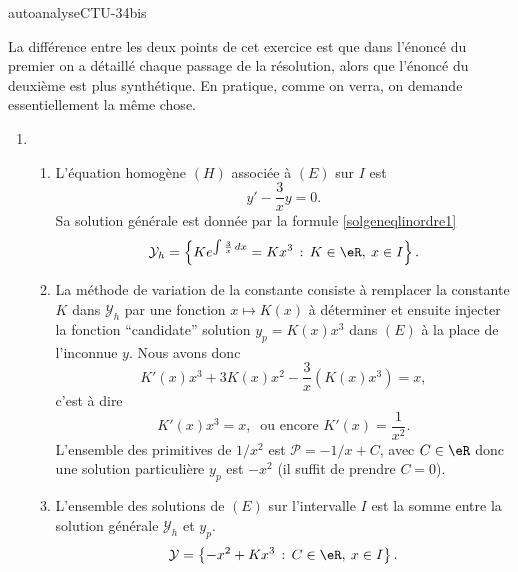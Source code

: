 
\begin{corrige}{autoanalyseCTU-34bis}

La différence entre les deux points de cet exercice est que dans l'énoncé du  premier on a détaillé chaque passage de la résolution, alors que l'énoncé du deuxième est plus synthétique. En pratique, comme on verra, on demande essentiellement la m\^eme chose.  

\begin{enumerate}
\item 
    \begin{enumerate}
    \item L'équation homogène $(H)$ associée à $(E)$ sur $I$ est 
      \begin{equation*}
        y'-\dfrac{3}{x}y=0. 
      \end{equation*}
      Sa solution générale est donnée par la formule \eqref{solgeneqlinordre1}
      \begin{equation*}
        \mathcal{Y}_h=\left\{Ke^{\int\frac{3}{x}\, dx} = Kx^3\,:\, K\in\eR, \: x\in I \right\}.
      \end{equation*}
    \item La méthode de variation de la constante consiste à remplacer la constante $K$ dans $\mathcal{Y}_h$ par une fonction $x\mapsto K(x)$ à déterminer et ensuite injecter la fonction ``candidate'' solution $y_p = K(x)x^3$ dans $(E)$ à la place de l'inconnue $y$. Nous avons donc 
      \begin{equation*}
        K'(x)x^3 + 3 K(x) x^2 -\dfrac{3}{x} (K(x)x^3)  = x,
      \end{equation*}
      c'est à dire 
      \begin{equation*}
        K'(x)x^3  = x, \:\text{ ou encore } K'(x)  = \frac{1}{x^2}. 
      \end{equation*}
      L'ensemble des primitives de $1/x^2$ est $\mathcal{P} = -1/x + C$, avec $C\in \eR$ donc une  solution particulière $y_p$ est $-x^2$ (il suffit de prendre $C=0$). 
    \item L'ensemble des solutions de $(E)$ sur l'intervalle $I$ est la somme entre la solution générale $\mathcal{Y}_h$ et $y_p$.
      \begin{equation}\label{solgenexo34bis1}
        \mathcal{Y}=\left\{ -x^2 + Kx^3\,:\, C\in\eR, \: x\in I \right\}.
      \end{equation} 

\end{enumerate}
\end{enumerate}
\end{corrige}

